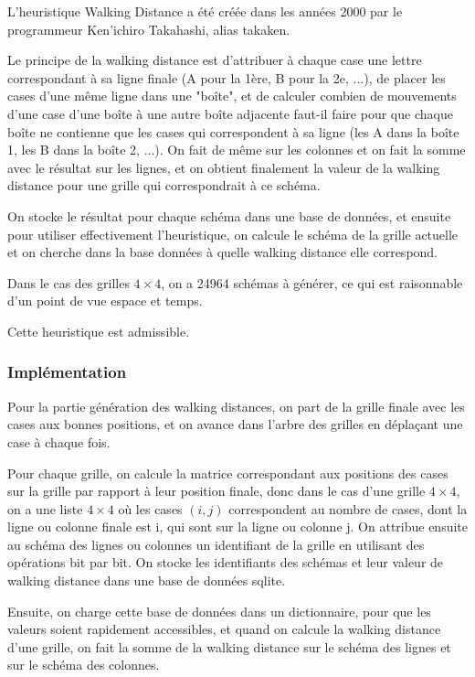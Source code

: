 \documentclass[a4paper, 12pt]{article}
\begin{document}
L'heuristique Walking Distance a été créée dans les années 2000 par le programmeur Ken'ichiro Takahashi, alias takaken.

Le principe de la walking distance est d'attribuer à chaque case une lettre correspondant à sa ligne finale (A pour la 1ère, B pour la 2e, ...), de placer les cases d'une même ligne dans une "boîte", et de calculer combien de mouvements d'une case d'une boîte à une autre boîte adjacente faut-il faire pour que chaque boîte ne contienne que les cases qui correspondent à sa ligne (les A dans la boîte 1, les B dans la boîte 2, ...).
On fait de même sur les colonnes et on fait la somme avec le résultat sur les lignes, et on obtient finalement la valeur de la walking distance pour une grille qui correspondrait à ce schéma.

On stocke le résultat pour chaque schéma dans une base de données, et ensuite pour utiliser effectivement l'heuristique, on calcule le schéma de la grille actuelle et on cherche dans la base données à quelle walking distance elle correspond.

Dans le cas des grilles $4 \times 4$, on a 24964 schémas à générer, ce qui est raisonnable d'un point de vue espace et temps.

Cette heuristique est admissible.

\subsubsection{Implémentation}

Pour la partie génération des walking distances, on part de la grille finale avec les cases aux bonnes positions, et on avance dans l'arbre des grilles en déplaçant une case à chaque fois.

Pour chaque grille, on calcule la matrice correspondant aux positions des cases sur la grille par rapport à leur position finale, donc dans le cas d'une grille $4 \times 4$, on a une liste $4 \times 4$ où les cases $(i, j)$ correspondent au nombre de cases, dont la ligne ou colonne finale est i, qui sont sur la ligne ou colonne j.
On attribue ensuite au schéma des lignes ou colonnes un identifiant de la grille en utilisant des opérations bit par bit.
On stocke les identifiants des schémas et leur valeur de walking distance dans une base de données sqlite.

Ensuite, on charge cette base de données dans un dictionnaire, pour que les valeurs soient rapidement accessibles, et quand on calcule la walking distance d'une grille, on fait la somme de la walking distance sur le schéma des lignes et sur le schéma des colonnes.
\end{document}
